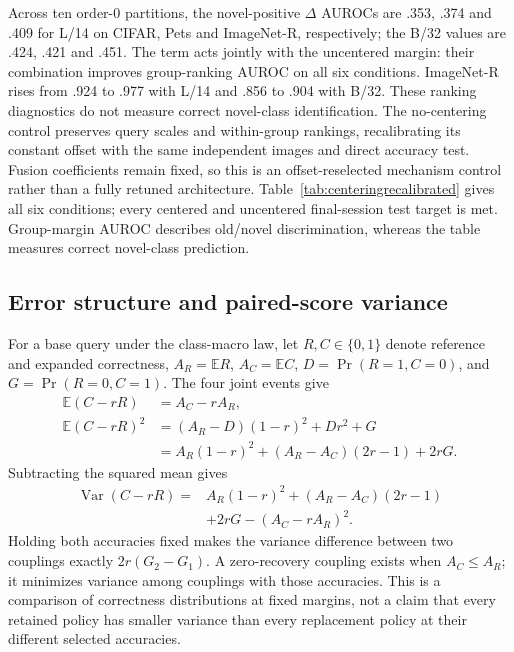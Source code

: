 \documentclass[preprint,review,12pt]{elsarticle}
\begin{document}
Across ten order-0 partitions, the novel-positive $\Delta$ AUROCs are .353, .374 and .409 for L/14 on CIFAR, Pets and ImageNet-R, respectively; the B/32 values are .424, .421 and .451. The term acts jointly with the uncentered margin: their combination improves group-ranking AUROC on all six conditions. ImageNet-R rises from .924 to .977 with L/14 and .856 to .904 with B/32. These ranking diagnostics do not measure correct novel-class identification. The no-centering control preserves query scales and within-group rankings, recalibrating its constant offset with the same independent images and direct accuracy test. Fusion coefficients remain fixed, so this is an offset-reselected mechanism control rather than a fully retuned architecture. Table~\ref{tab:centeringrecalibrated} gives all six conditions; every centered and uncentered final-session test target is met. Group-margin AUROC describes old/novel discrimination, whereas the table measures correct novel-class prediction.

\begin{table}[!htbp]
\centering\setlength{\belowcaptionskip}{8pt}
\caption{Centering with independently reselected offsets. Query/None denotes centered/uncentered retained fusion. Finite counts admission; all variants attain 10/10 empirical test targets. Base and Novel are fallback-inclusive test means at arrival 5, order 0; gain is Query minus None with a conditional paired 95\% interval. Both use identical cap-40 calibration images, candidate construction, direct tests, query scales and fusion coefficients.}
\label{tab:centeringrecalibrated}
\resizebox{\linewidth}{!}{}
\end{table}


\subsection{Error structure and paired-score variance}
For a base query under the class-macro law, let $R,C\in\{0,1\}$ denote reference and expanded correctness, $A_R=\mathbb E R$, $A_C=\mathbb E C$, $D=\Pr(R=1,C=0)$, and $G=\Pr(R=0,C=1)$. The four joint events give
\begin{align}
 \mathbb E(C-rR)&=A_C-rA_R,\\
 \mathbb E(C-rR)^2&=(A_R-D)(1-r)^2+Dr^2+G\\
 &=A_R(1-r)^2+(A_R-A_C)(2r-1)+2rG.
\end{align}
Subtracting the squared mean gives
\begin{equation}
\begin{split}
\operatorname{Var}(C-rR)={}&A_R(1-r)^2+(A_R-A_C)(2r-1)\\
&+2rG-(A_C-rA_R)^2.
\end{split}
\label{eq:pairedvariance}
\end{equation} Holding both accuracies fixed makes the variance difference between two couplings exactly $2r(G_2-G_1)$. A zero-recovery coupling exists when $A_C\leq A_R$; it minimizes variance among couplings with those accuracies. This is a comparison of correctness distributions at fixed margins, not a claim that every retained policy has smaller variance than every replacement policy at their different selected accuracies.
\end{document}
